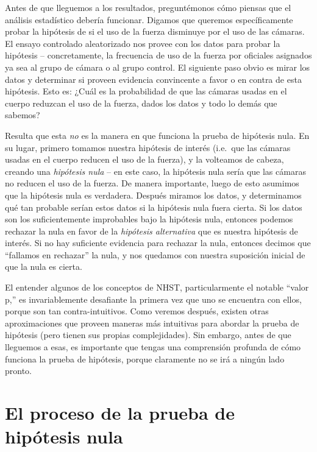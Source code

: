 \documentclass[
  12pt,
]{book}
\theoremstyle{definition}
\theoremstyle{definition}
\theoremstyle{definition}
\theoremstyle{remark}
\begin{document}
Antes de que lleguemos a los resultados, preguntémonos cómo piensas que el análisis estadístico debería funcionar. Digamos que queremos específicamente probar la hipótesis de si el uso de la fuerza disminuye por el uso de las cámaras. El ensayo controlado aleatorizado nos provee con los datos para probar la hipótesis -- concretamente, la frecuencia de uso de la fuerza por oficiales asignados ya sea al grupo de cámara o al grupo control. El siguiente paso obvio es mirar los datos y determinar si proveen evidencia convincente a favor o en contra de esta hipótesis. Esto es: ¿Cuál es la probabilidad de que las cámaras usadas en el cuerpo reduzcan el uso de la fuerza, dados los datos y todo lo demás que sabemos?

Resulta que esta \emph{no} es la manera en que funciona la prueba de hipótesis nula. En su lugar, primero tomamos nuestra hipótesis de interés (i.e.~que las cámaras usadas en el cuerpo reducen el uso de la fuerza), y la volteamos de cabeza, creando una \emph{hipótesis nula} -- en este caso, la hipótesis nula sería que las cámaras no reducen el uso de la fuerza. De manera importante, luego de esto asumimos que la hipótesis nula es verdadera. Después miramos los datos, y determinamos qué tan probable serían estos datos si la hipótesis nula fuera cierta. Si los datos son los suficientemente improbables bajo la hipótesis nula, entonces podemos rechazar la nula en favor de la \emph{hipótesis alternativa} que es nuestra hipótesis de interés. Si no hay suficiente evidencia para rechazar la nula, entonces decimos que ``fallamos en rechazar'' la nula, y nos quedamos con nuestra suposición inicial de que la nula es cierta.

El entender algunos de los conceptos de NHST, particularmente el notable ``valor p,'' es invariablemente desafiante la primera vez que uno se encuentra con ellos, porque son tan contra-intuitivos. Como veremos después, existen otras aproximaciones que proveen maneras más intuitivas para abordar la prueba de hipótesis (pero tienen sus propias complejidades). Sin embargo, antes de que lleguemos a esas, es importante que tengas una comprensión profunda de cómo funciona la prueba de hipótesis, porque claramente no se irá a ningún lado pronto.

\hypertarget{el-proceso-de-la-prueba-de-hipuxf3tesis-nula}{%
\section{El proceso de la prueba de hipótesis nula}\label{el-proceso-de-la-prueba-de-hipuxf3tesis-nula}}
\end{document}
